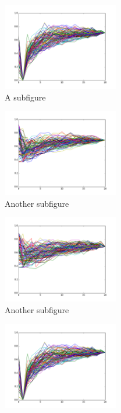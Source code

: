 \documentclass[11pt]{scrartcl}
\begin{document}
\begin{figure}
	\begin{subfigure}[b]{.3\linewidth}
		\centering
		\includegraphics[width=2.0in, height=1.5in] {majority_p(edge=1|obs=1)_advice_shuffles.png}
		\caption{A subfigure}\label{fig:1a}
	\end{subfigure}
	\begin{subfigure}[b]{.3\linewidth}
		\centering
		\includegraphics[width=2.0in, height=1.5in]{neighbor_p(edge=1|obs=1)_advice_shuffles.png}
		\caption{Another subfigure}\label{fig:1b}
	\end{subfigure}
	\begin{subfigure}[b]{.3\linewidth}
		\centering
		\includegraphics[width=2.0in, height=1.5in]     {block_p(edge=1|obs=1)_advice_shuffles.png}
		\caption{Another subfigure}\label{fig:1c}
	\end{subfigure}
	\caption{FIRST Row}
	\begin{subfigure}[b]{.3\linewidth}
		\centering
		\includegraphics[width=2.0in, height=1.5in] {majority_p(edge=1|obs=1)_advice_shuffles.png}

\end{subfigure}
\end{figure}
\end{document}
